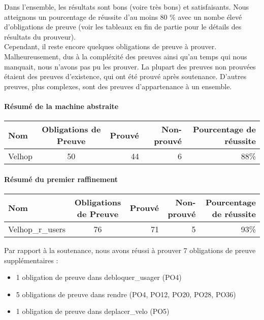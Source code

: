 \documentclass[12pt]{article}
\begin{document}
Dans l'ensemble, les résultats sont bons (voire très bons) et satisfaisants. Nous atteignons un pourcentage de réussite d'au moins 80 \% avec un nombe élevé d'obligations de preuve (voir les tableaux en fin de partie pour le détails des résultats du prouveur).\\

Cependant, il reste encore quelques obligations de preuve à prouver. Malheureusement, dus à la compléxité des preuves ainsi qu'au temps qui nous manquait, nous n'avons pas pu les prouver. La plupart des preuves non prouvées étaient des preuves d'existence, qui ont été prouvé après soutenance. D'autres preuves, plus complexes, sont des preuves d'appartenance à un ensemble.
\paragraph{Résumé de la machine abstraite}
\begin{center}
	\begin{tabular}{| l | c | r | r| r |}
		\hline
		Nom & Obligations de Preuve & Prouvé & Non-prouvé & Pourcentage de réussite \\ \hline
		Velhop & 50 & 44 & 6 & 88\% \\ \hline
	\end{tabular}
\end{center}

\paragraph{Résumé du premier raffinement}
\begin{center}
	\begin{tabular}{| l | c | r | r|r|}
		\hline
    Nom & Obligations de Preuve & Prouvé & Non-prouvé & Pourcentage de réussite\\ \hline
    Velhop\_r\_users & 76 & 71 & 5 & 93\% \\ \hline
	\end{tabular}
\end{center}

Par rapport à la soutenance, nous avons réussi à prouver 7 obligations de preuve supplémentaires : 
\begin{itemize}
  \item 1 obligation de preuve dans debloquer\_usager (PO4)
  \item 5 obligations de preuve dans rendre (PO4, PO12, PO20, PO28, PO36)
  \item 1 obligation de preuve dans deplacer\_velo (PO5)
\end{itemize}
\end{document}
